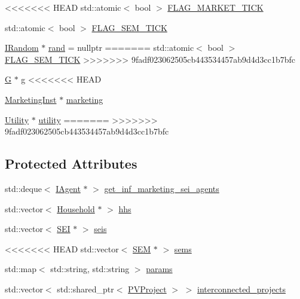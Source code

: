 \begin{DoxyCompactItemize}
<<<<<<< HEAD
std\+::atomic$<$ bool $>$ \hyperlink{classsolar__core_1_1_w_a7aa8b882244539e098e45207045d7d88}{F\+L\+A\+G\+\_\+\+M\+A\+R\+K\+E\+T\+\_\+\+T\+I\+C\+K}
\item 
std\+::atomic$<$ bool $>$ \hyperlink{classsolar__core_1_1_w_ae383b7a595cb28d52aa747fc7e5bb619}{F\+L\+A\+G\+\_\+\+S\+E\+M\+\_\+\+T\+I\+C\+K}
\item 
\hyperlink{classsolar__core_1_1_i_random}{I\+Random} $\ast$ \hyperlink{classsolar__core_1_1_w_aa60afb55012cd72e304ac2c133e5a245}{rand} = nullptr
=======
std\+::atomic$<$ bool $>$ \hyperlink{classsolar__core_1_1_w_ae383b7a595cb28d52aa747fc7e5bb619}{F\+L\+A\+G\+\_\+\+S\+E\+M\+\_\+\+T\+I\+C\+K}
>>>>>>> 9fadf023062505cb443534457ab9d4d3cc1b7bfc
\end{DoxyCompactItemize}

{\bf }\par
\begin{DoxyCompactItemize}
\item 
\hyperlink{classsolar__core_1_1_g}{G} $\ast$ \hyperlink{classsolar__core_1_1_w_a9e50ef0da579cdfc3da22c16a492bc44}{g}
<<<<<<< HEAD
\item 
\hyperlink{classsolar__core_1_1_marketing_inst}{Marketing\+Inst} $\ast$ \hyperlink{classsolar__core_1_1_w_a93f277fb3a9d9e7b1e911c6a494c8ec8}{marketing}
\item 
\hyperlink{classsolar__core_1_1_utility}{Utility} $\ast$ \hyperlink{classsolar__core_1_1_w_a6d6fa51d4bdc40dac8b76aa4967030b5}{utility}
=======
>>>>>>> 9fadf023062505cb443534457ab9d4d3cc1b7bfc
\end{DoxyCompactItemize}

\subsection*{Protected Attributes}
\begin{DoxyCompactItemize}
\item 
std\+::deque$<$ \hyperlink{classsolar__core_1_1_i_agent}{I\+Agent} $\ast$ $>$ \hyperlink{classsolar__core_1_1_w_a81b5469757f203c9619ff69323ac0f77}{get\+\_\+inf\+\_\+marketing\+\_\+sei\+\_\+agents}
\item 
std\+::vector$<$ \hyperlink{classsolar__core_1_1_household}{Household} $\ast$ $>$ \hyperlink{classsolar__core_1_1_w_a17c012ff8b17890ed33923cec6d87be3}{hhs}
\item 
std\+::vector$<$ \hyperlink{classsolar__core_1_1_s_e_i}{S\+E\+I} $\ast$ $>$ \hyperlink{classsolar__core_1_1_w_a311baa30390494ae8e79f26e372e716d}{seis}
\item 
<<<<<<< HEAD
std\+::vector$<$ \hyperlink{classsolar__core_1_1_s_e_m}{S\+E\+M} $\ast$ $>$ \hyperlink{classsolar__core_1_1_w_ab6349cbc751747a05618dad4ebb1b726}{sems}
\item 
std\+::map$<$ std\+::string, std\+::string $>$ \hyperlink{classsolar__core_1_1_w_a0d06bc7242f8b3958986118eb217583f}{params}
\item 
std\+::vector$<$ std\+::shared\+\_\+ptr$<$ \hyperlink{classsolar__core_1_1_p_v_project}{P\+V\+Project} $>$ $>$ \hyperlink{classsolar__core_1_1_w_a1d35d6501eef6d673bd2b28e2c1724c4}{interconnected\+\_\+projects}
\end{DoxyCompactItemize}

